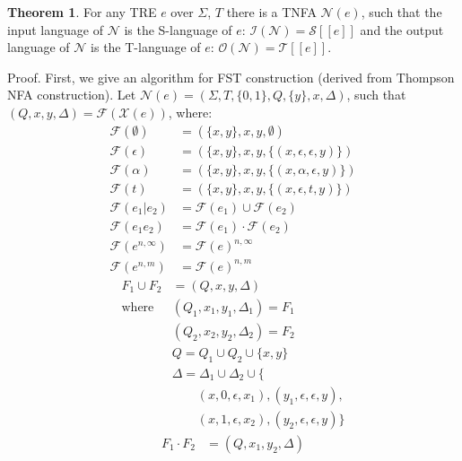 \documentclass{article}
\newcommand{\Xeq}{\!=\!}
\newcommand{\Xlb}{[\![}
\newcommand{\Xrb}{]\!]}
\newcommand{\XF}{\mathcal{F}}
\newcommand{\XI}{\mathcal{I}}
\newcommand{\XN}{\mathcal{N}}
\newcommand{\XO}{\mathcal{O}}
\newcommand{\XS}{\mathcal{S}}
\newcommand{\XT}{\mathcal{T}}
\newcommand{\XX}{\mathcal{X}}
\theoremstyle{definition}
\newtheorem{XThe}{Theorem}
\begin{document}
\begin{multicols}{2}
\begin{XThe}\label{theorem_tnfa}
For any TRE $e$ over $\Sigma$, $T$ there is a TNFA $\XN(e)$, such that
the input language of $\XN$ is the S-language of $e$:
$\XI(\XN) \Xeq \XS \Xlb e \Xrb$ and
the output language of $\XN$ is the T-language of $e$:
$\XO(\XN) \Xeq \XT \Xlb e \Xrb$.

\smallskip

Proof.
First, we give an algorithm for FST construction (derived from Thompson NFA construction).
Let $\XN(e) \Xeq (\Sigma, T, \{0, 1\}, Q, \{ y \}, x, \Delta)$, such that $(Q, x, y, \Delta) \Xeq \XF(\XX(e))$, where:
    \begin{align*}
        \XF(\emptyset) &= (\{ x, y \}, x, y, \emptyset) \tag{1a} \\
        \XF(\epsilon) &= (\{ x, y \}, x, y, \{ (x, \epsilon, \epsilon, y) \}) \tag{1b} \\
        \XF(\alpha) &= (\{ x, y \}, x, y, \{ (x, \alpha, \epsilon, y) \}) \tag{1c} \\
        \XF(t) &= (\{ x, y \}, x, y, \{ (x, \epsilon, t, y) \}) \tag{1d} \\
        \XF(e_1 | e_2) &= \XF(e_1) \cup \XF(e_2) \tag{1e} \label{tnfaalt} \\
        \XF(e_1 e_2) &= \XF(e_1) \cdot \XF(e_2) \tag{1f} \label{tnfacat} \\
        \XF(e^{n,\infty}) &= \XF(e)^{n,\infty} \tag{1g} \label{tnfaunbounditer} \\
        \XF(e^{n,m}) &= \XF(e)^{n, m} \tag{1h} \label{tnfabounditer}
    \end{align*}
%
    \begin{align*}
        F_1 \cup F_2 &= (Q, x, y, \Delta) \tag{1i} \label{tnfaaltconstr} \\
        \text{where }
            & (Q_1, x_1, y_1, \Delta_1) = F_1 \\
            & (Q_2, x_2, y_2, \Delta_2) = F_2 \\
            & Q = Q_1 \cup Q_2 \cup \{ x, y \} \\
            & \Delta = \Delta_1 \cup \Delta_2 \cup \{ \\
                & \qquad (x, 0, \epsilon, x_1), (y_1, \epsilon, \epsilon, y), \\
                & \qquad (x, 1, \epsilon, x_2), (y_2, \epsilon, \epsilon, y) \}
    \end{align*}
%
    \begin{align*}
        F_1 \cdot F_2 &= (Q, x_1, y_2, \Delta) \tag{1j} \label{tnfacatconstr} \\

\end{align*}
\end{XThe}
\end{multicols}
\end{document}
